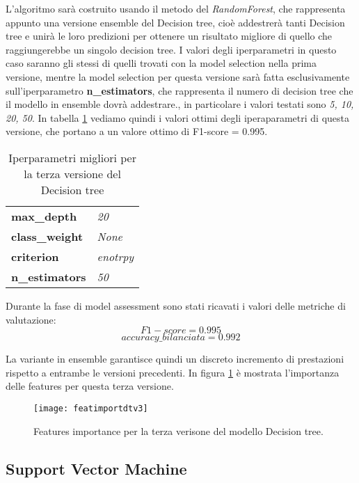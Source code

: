 L'algoritmo sarà costruito usando il metodo del \textit{RandomForest}, che rappresenta appunto una versione ensemble del Decision tree, cioè addestrerà tanti Decision tree e unirà le loro predizioni per ottenere un risultato migliore di quello che raggiungerebbe un singolo decision tree. I valori degli iperparametri in questo caso saranno gli stessi di quelli trovati con la model selection nella prima versione, mentre la model selection per questa versione sarà fatta esclusivamente sull'iperparametro \textbf{n\_estimators}, che rappresenta il numero di decision tree che il modello in ensemble dovrà addestrare., in particolare i valori testati sono \textit{5, 10, 20, 50}. In tabella \ref{tab:dtv3} vediamo quindi i valori ottimi degli iperaparametri di questa versione, che portano a un valore ottimo di F1-score = 0.995.

\begin{table}[h] 
\centering
\begin{tabular}{l l}
\hline
\textbf{max\_depth} & \textit{20}\\
\textbf{class\_weight} & \textit{None}\\
\textbf{criterion} & \textit{enotrpy}\\
\textbf{n\_estimators} & \textit{50}\\
\hline
\end{tabular}
\caption{Iperparametri migliori per la terza versione del Decision tree}
\label{tab:dtv3}
\end{table}

Durante la fase di model assessment sono stati ricavati i valori delle metriche di valutazione:
$$F1-score = 0.995$$
$$accuracy\_bilanciata = 0.992$$

La variante in ensemble garantisce quindi un discreto incremento di prestazioni rispetto a entrambe le versioni precedenti. In figura \ref{fig:featuresimportancedtv3} è mostrata l'importanza delle features per questa terza versione.

\begin{figure}[h]
    \centering\texttt{[image: featimportdtv3]}
    \caption{Features importance per la terza verisone del modello Decision tree.}
    \label{fig:featuresimportancedtv3}
\end{figure}

\subsection{Support Vector Machine}
